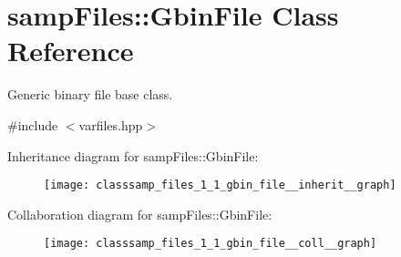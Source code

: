 \hypertarget{classsamp_files_1_1_gbin_file}{}\section{samp\+Files\+:\+:Gbin\+File Class Reference}
\label{classsamp_files_1_1_gbin_file}


Generic binary file base class.  




{\ttfamily \#include $<$varfiles.\+hpp$>$}



Inheritance diagram for samp\+Files\+:\+:Gbin\+File\+:\nopagebreak
\begin{figure}[H]
\begin{center}
\leavevmode
\texttt{[image: classsamp\_files\_1\_1\_gbin\_file\_\_inherit\_\_graph]}
\end{center}
\end{figure}


Collaboration diagram for samp\+Files\+:\+:Gbin\+File\+:\nopagebreak
\begin{figure}[H]
\begin{center}
\leavevmode
\texttt{[image: classsamp\_files\_1\_1\_gbin\_file\_\_coll\_\_graph]}
\end{center}
\end{figure}
